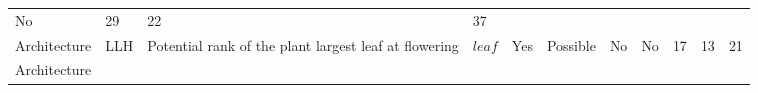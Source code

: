 \documentclass[a4paper]{article}
\begin{document}
\begin{longtable}[]{@{}llllccccrrr@{}}
\begin{minipage}[t]{0.04\columnwidth}
No\strut
\end{minipage} & \begin{minipage}[t]{0.04\columnwidth}\raggedleft\strut
29\strut
\end{minipage} & \begin{minipage}[t]{0.04\columnwidth}\raggedleft\strut
22\strut
\end{minipage} & \begin{minipage}[t]{0.04\columnwidth}\raggedleft\strut
37\strut
\end{minipage}\tabularnewline
\begin{minipage}[t]{0.08\columnwidth}\raggedright\strut
Architecture\strut
\end{minipage} & \begin{minipage}[t]{0.05\columnwidth}\raggedright\strut
LLH\strut
\end{minipage} & \begin{minipage}[t]{0.19\columnwidth}\raggedright\strut
Potential rank of the plant largest leaf at flowering\strut
\end{minipage} & \begin{minipage}[t]{0.06\columnwidth}\raggedright\strut
\(leaf\)\strut
\end{minipage} & \begin{minipage}[t]{0.06\columnwidth}\centering\strut
Yes\strut
\end{minipage} & \begin{minipage}[t]{0.08\columnwidth}\centering\strut
Possible\strut
\end{minipage} & \begin{minipage}[t]{0.05\columnwidth}\centering\strut
No\strut
\end{minipage} & \begin{minipage}[t]{0.04\columnwidth}\centering\strut
No\strut
\end{minipage} & \begin{minipage}[t]{0.04\columnwidth}\raggedleft\strut
17\strut
\end{minipage} & \begin{minipage}[t]{0.04\columnwidth}\raggedleft\strut
13\strut
\end{minipage} & \begin{minipage}[t]{0.04\columnwidth}\raggedleft\strut
21\strut
\end{minipage}\tabularnewline
\begin{minipage}[t]{0.08\columnwidth}\raggedright\strut
Architecture\strut
\end{minipage} & \begin{minipage}[t]{0.05\columnwidth}\raggedright\strut

\end{minipage}
\end{longtable}
\end{document}
